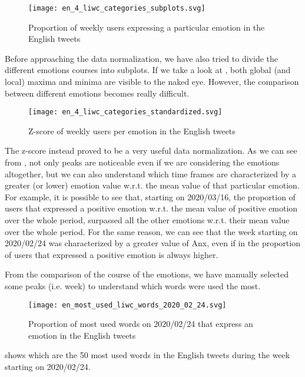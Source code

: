 \begin{figure}[H]
	\centering
    	\texttt{[image: en\_4\_liwc\_categories\_subplots.svg]}
    	\caption{Proportion of weekly users expressing a particular emotion in the English tweets}
    	\label{fig:en-4-liwc-categories-subplots}
\end{figure}

Before approaching the data normalization, we have also tried to divide the different emotions courses into subplots. If we take a look at , both global (and local) maxima and minima are visible to the naked eye. However, the comparison between different emotions becomes really difficult.

\begin{figure}[H]
	\centering
    	\texttt{[image: en\_4\_liwc\_categories\_standardized.svg]}
    	\caption{Z-score of weekly users per emotion in the English tweets}
    	\label{fig:en-4-liwc-categories-std}
\end{figure}

The z-score instead proved to be a very useful data normalization. As we can see from , not only peaks are noticeable even if we are considering the emotions altogether, but we can also understand which time frames are characterized by a greater (or lower) emotion value w.r.t. the mean value of that particular emotion. For example, it is possible to see that, starting on 2020/03/16, the proportion of users that expressed a positive emotion w.r.t. the mean value of positive emotion over the whole period, surpassed all the other emotions w.r.t. their mean value over the whole period. For the same reason, we can see that the week starting on 2020/02/24 was characterized by a greater value of Anx, even if in  the proportion of users that expressed a positive emotion is always higher.

From the comparison of the course of the emotions, we have manually selected some peaks (i.e. week) to understand which words were used the most. 

\begin{figure}[H]
	\centering
    	\texttt{[image: en\_most\_used\_liwc\_words\_2020\_02\_24.svg]}
    	\caption{Proportion of most used words on 2020/02/24 that express an emotion in the English tweets}
    	\label{fig:en-most-used-liwc-words-2020-02-24}
\end{figure}

 shows which are the 50 most used words in the English tweets during the week starting on 2020/02/24.

